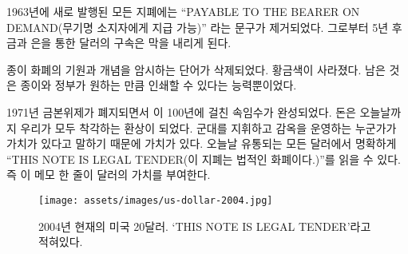 \begin{comment}
	In 1963, the words \enquote{PAYABLE TO THE BEARER ON DEMAND} were removed from
	all newly issued notes. Five years later, the redemption of paper notes
	for gold and silver ended.
\end{comment}
1963년에 새로 발행된 모든 지폐에는 
\enquote{PAYABLE TO THE BEARER ON DEMAND(무기명 소지자에게 지급 가능)} 라는 문구가 제거되었다. 
그로부터 5년 후 금과 은을 통한 달러의 구속은 막을 내리게 된다.

\begin{comment}
	The words hinting on the origins and the idea behind paper money were
	removed. The golden color disappeared. All that was left was the paper
	and with it the ability of the government to print as much of it as it
	wishes.
\end{comment}
종이 화폐의 기원과 개념을 암시하는 단어가 삭제되었다. 
황금색이 사라졌다. 
남은 것은 종이와 정부가 원하는 만큼 인쇄할 수 있다는 능력뿐이었다.

\begin{comment}
	With the abolishment of the gold standard in 1971, this century-long
	sleight-of-hand was complete. Money became the illusion we all share to
	this day: fiat money. It is worth something because someone commanding
	an army and operating jails says it is wort능h something. As can be
	clearly read on every dollar note in circulation today, \enquote{THIS NOTE IS
		LEGAL TENDER}. In other words: It is valuable because the note says so.
\end{comment}
1971년 금본위제가 폐지되면서 이 100년에 걸친 속임수가 완성되었다. 
돈은 오늘날까지 우리가 모두 착각하는 환상이 되었다. 
군대를 지휘하고 감옥을 운영하는 누군가가 가치가 있다고 말하기 때문에 가치가 있다. 
오늘날 유통되는 모든 달러에서 명확하게 \enquote{THIS NOTE IS
	LEGAL TENDER(이 지폐는 법적인 화폐이다.)}를 읽을 수 있다.
즉 이 메모 한 줄이 달러의 가치를 부여한다.

\begin{comment}
	\begin{figure}
		\centering
		\texttt{[image: assets/images/us-dollar-2004.jpg]}
		\caption{A 2004 series U.S. twenty dollar note used today. `THIS NOTE IS LEGAL TENDER'}
		\label{fig:us-dollar-2004}
	\end{figure}
\end{comment}
\begin{figure}
	\centering
	\texttt{[image: assets/images/us-dollar-2004.jpg]}
	\caption{2004년 현재의 미국 20달러. `THIS NOTE IS LEGAL TENDER'라고 적혀있다.}
	\label{fig:us-dollar-2004}
\end{figure}

